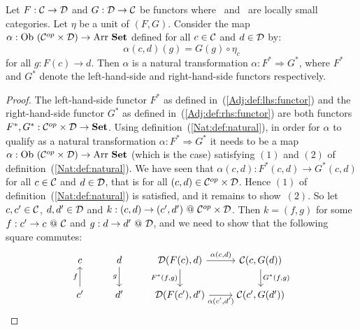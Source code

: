 \begin{prop}\label{Adj:prop:natural:left:right}
    Let $F:\mbox{$\cal C$}\to\mbox{$\cal D$}$ and $G:\mbox{$\cal D$}\to\mbox{$\cal C$}$ be functors where \Cat\ and \Dat\ 
    are locally small categories. Let $\eta$ be a unit of $(F,G)$. Consider the
    map $\alpha:\ob\ (\Cop\times\Dat)\to\arr\ \Set$ defined for all $c\in\mbox{$\cal C$}$ and
    $d\in\mbox{$\cal D$}$ by:
        \[
            \alpha(c,d)(g)=G(g)\circ\eta_{c}
        \]
    for all $g:F(c)\to d$. Then $\alpha$ is a natural transformation 
    $\alpha:F^{*}\Rightarrow G^{*}$, where $F^{*}$ and $G^{*}$ denote
    the left-hand-side and right-hand-side functors respectively.
\end{prop}
\begin{proof}
    The left-hand-side functor $F^{*}$ as defined in~(\ref{Adj:def:lhs:functor})
    and the right-hand-side functor $G^{*}$ as defined 
    in~(\ref{Adj:def:rhs:functor}) are both functors 
    $F^{*},G^{*}:\mbox{${\cal C}^{op}$}\times\mbox{$\cal D$}\to\mbox{\bf Set}$. Using definition~(\ref{Nat:def:natural}),
    in order for $\alpha$ to qualify as a natural transformation 
    $\alpha:F^{*}\Rightarrow G^{*}$ it needs to be a map
    $\alpha:\ob\ (\Cop\times\Dat)\to\arr\ \Set$ (which is the case) satisfying
    $(1)$ and $(2)$ of definition~(\ref{Nat:def:natural}). We have
    seen that $\alpha(c,d):F^{*}(c,d)\to G^{*}(c,d)$ for all $c\in\mbox{$\cal C$}$
    and $d\in\mbox{$\cal D$}$, that is for all $(c,d)\in\mbox{${\cal C}^{op}$}\times\mbox{$\cal D$}$. Hence $(1)$ of
    definition~(\ref{Nat:def:natural}) is satisfied, and it remains to show~$(2)$.
    So let $c,c'\in\mbox{$\cal C$}$, $d,d'\in\mbox{$\cal D$}$ and $k:(c,d)\to(c',d')\ @\ \mbox{${\cal C}^{op}$}\times\mbox{$\cal D$}$.
    Then $k=(f,g)$ for some $f:c'\to c\ @\ \mbox{$\cal C$}$ and $g:d \to d'\ @\ \mbox{$\cal D$}$, and
    we need to show that the following square commutes:
    \[
        \begin{tikzcd}
            c
            &d\arrow[d,swap, "g"]
            &\Dat(F(c),d)\arrow[r, "\alpha\mbox{$(c,d)$}"]
             \arrow[d, swap,"F^{*}\mbox{$(f,g)$}"]
            &\Cat(c,G(d))
             \arrow[d, "G^{*}\mbox{$(f,g)$}"]
            \\
            c'\arrow[u, "f"]
            &d'
            &\Dat(F(c'),d')\arrow[r, swap, "\alpha\mbox{$(c',d')$}"]
            &\Cat(c',G(d'))
        \end{tikzcd}
    \]
\end{proof}
